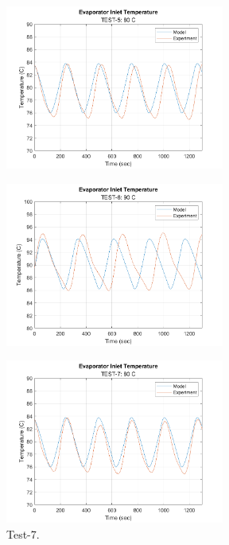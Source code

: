 \bigskip

\begin{figure}[h]
    \begin{minipage}{.5\textwidth}
        \centering
        \includegraphics[width=7.2cm]{images/TEST-5.png}
        \label{fig:test5}
    \end{minipage}%
    \begin{minipage}{.4\textwidth}
        \centering
        \includegraphics[width=7.2cm]{images/TEST-6.png}
        \label{fig:test6}
    \end{minipage}
\end{figure}

\bigskip

\begin{figure}
    \centering
    \includegraphics[width=7.2cm]{images/TEST-7.png}
    \caption{Test-7.}
    \label{fig:test7}
\end{figure}

